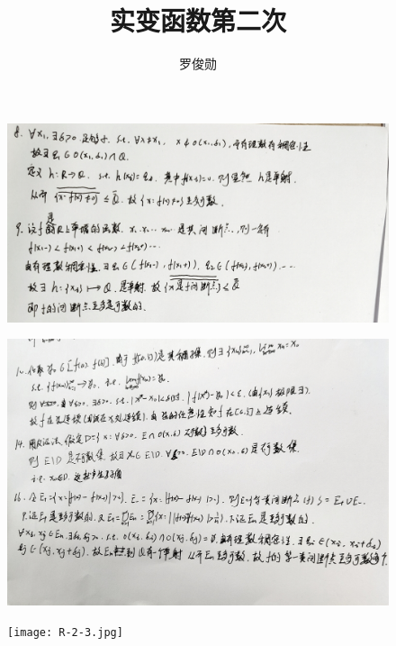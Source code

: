 \documentclass[12pt, a4paper, oneside]{ctexart}
\title{\huge\textbf{实变函数第二次}}
\author{罗俊勋}
\begin{document}
\maketitle




\begin{figure}[p]
    \centerline{\includegraphics[width=1.2\linewidth,height=0.4\textheight]{R-2-1.jpg}}
\end{figure}

\begin{figure}[p]
    \centerline{\includegraphics[width=1.2\linewidth,height=0.5\textheight]{R-2-2.jpg}}
    \end{figure}

\begin{figure}[p]
    \centerline{\texttt{[image: R-2-3.jpg]}}
\end{figure}
\end{document}
